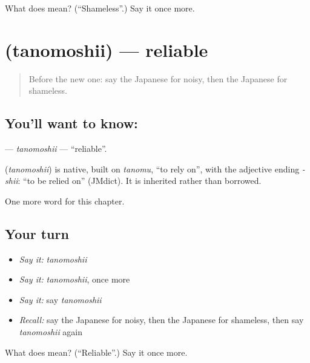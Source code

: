 \begin{tcolorbox}[breakable,colback=teal!4,colframe=teal!35!black,title={Before you move on}]
What does  mean? (\textquotedblleft{}Shameless\textquotedblright{}.) Say it once more.
\end{tcolorbox}
\section[\texorpdfstring{\ja{たのもしい} (tanomoshii)}{たのもしい (tanomoshii)}]{ (tanomoshii) — reliable}

\label{lesson:JA-C129-tanomoshii}



\begin{quote}
Before the new one: say the Japanese for noisy, then the Japanese for shameless.
\end{quote}

\subsection*{You'll want to know: }
\textbf{} — \emph{tanomoshii} — \textquotedblleft{}reliable\textquotedblright{}.

\begin{cousinweb}
\textbf{} (\emph{tanomoshii}) is native, built on \emph{tanomu}, \textquotedblleft{}to rely on\textquotedblright{}, with the adjective ending \emph{-shii}: \textquotedblleft{}to be relied on\textquotedblright{} (JMdict). It is inherited rather than borrowed.
\end{cousinweb}

\begin{grammarlens}[title={What you've built}]
One more word for this chapter.
\end{grammarlens}

\subsection*{Your turn}
\begin{itemize}
\raggedright
  \item \emph{Say it:} \emph{tanomoshii}
  \item \emph{Say it:} \emph{tanomoshii}, once more
  \item \emph{Say it:} say \emph{tanomoshii}
  \item \emph{Recall:} say the Japanese for noisy, then the Japanese for shameless, then say \emph{tanomoshii} again
\end{itemize}

\begin{tcolorbox}[breakable,colback=teal!4,colframe=teal!35!black,title={Before you move on}]
What does  mean? (\textquotedblleft{}Reliable\textquotedblright{}.) Say it once more.
\end{tcolorbox}
